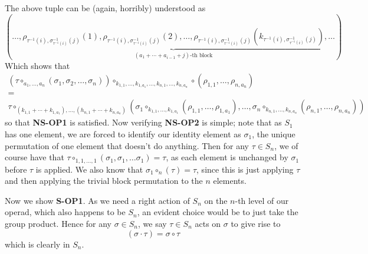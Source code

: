 \begin{example}
The above tuple can be (again, horribly) understood as 
\[        
    (
    \dots,
    \underbrace{\rho_{\tau^{-1}(i), \sigma_{\tau^{-1}(i)}^{-1}(j)}(1), 
    \rho_{\tau^{-1}(i), \sigma_{\tau^{-1}(i)}^{-1}(j)}(2),
    \dots, 
    \rho_{\tau^{-1}(i), \sigma_{\tau^{-1}(i)}^{-1}(j)}(k_{\tau^{-1}(i), \sigma_{\tau^{-1}(i)}^{-1}(j)})
    }_{(a_1 + \cdots + a_{i-1}+j)\text{-th block}}
    ,\dots
    )
\]
Which shows that 
\begin{gather*}
    (\tau \circ_{a_1, \dots, a_n} (\sigma_1, \sigma_2, \dots, \sigma_n))\circ_{k_{1,1}, \dots, k_{1, a_1}, \dots, k_{n, 1}, \dots, k_{n, a_n}}
    \circ(\rho_{1,1}, \dots, \rho_{n, a_n})\\
    =\\
    \tau \circ_{(k_{1,1} + \cdots + k_{1,a_1}), \dots, (h_{n, 1} + \cdots + k_{n,a_n})}
    (\sigma_1 \circ_{k_{1,1}, \dots, k_{1,a_1}}(\rho_{1,1}, \dots, \rho_{1,a_1}),
    \dots,
    \sigma_n \circ_{k_{n,1}, \dots, k_{n,a_n}}(\rho_{n,1}, \dots, \rho_{n,a_n}) 
    )
\end{gather*}
so that \textbf{NS-OP1} is satisfied. Now verifying \textbf{NS-OP2} is simple; 
note that as $S_1$ has one element, we are forced to identify our identity element 
as $\sigma_1$, the unique permutation of one element that doesn't do anything. Then 
for any $\tau \in S_n$, we of course have that $\tau \circ_{1, 1, \dots, 1}(\sigma_1, \sigma_1, \dots \sigma_1)
= \tau$, as each element is unchanged by $\sigma_1$ before $\tau$ is applied. 
We also know that $\sigma_1 \circ_n (\tau) = \tau$, since this is just 
applying $\tau$ and then applying the trivial block permutation to the $n$ elements.

Now we show \textbf{S-OP1}. As we need a right action of $S_n$ on the $n$-th level 
of our operad, which also happens to be $S_n$, an evident choice would be to 
just take the group product. Hence for any $\sigma \in S_n$, we say $\tau \in S_n$ 
acts on $\sigma$ to give rise to 
\[
    (\sigma \cdot \tau) = \sigma \circ \tau
\]
which is clearly in $S_n$. 


\end{example}
